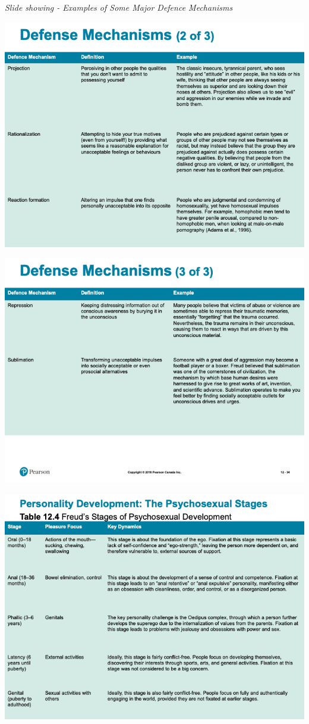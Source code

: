 \documentclass[
]{book}
\begin{document}
\begin{reflect}
\emph{Slide showing - Examples of Some Major Defence Mechanisms}

\includegraphics{assets/unit_5/slide_33.png}

\includegraphics{assets/unit_5/slide_34.png}

\includegraphics{assets/unit_5/slide_35.png}


\end{reflect}
\end{document}
